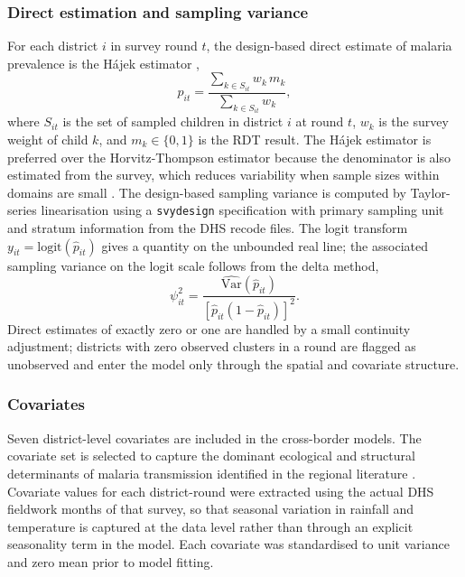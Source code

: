 \documentclass{article}
\begin{document}
\subsubsection{Direct estimation and sampling
variance}\label{direct-estimation-and-sampling-variance}

For each district \(i\) in survey round \(t\), the design-based direct
estimate of malaria prevalence is the Hájek estimator \citep{hajek1971},
\begin{equation}
\hat{p}_{it} = \frac{\sum_{k \in S_{it}} w_k \, m_k}{\sum_{k \in S_{it}} w_k},
\label{eq:hajek}
\end{equation} where \(S_{it}\) is the set of sampled children in
district \(i\) at round \(t\), \(w_k\) is the survey weight of child
\(k\), and \(m_k \in \{0, 1\}\) is the RDT result. The Hájek estimator
is preferred over the Horvitz-Thompson estimator because the denominator
is also estimated from the survey, which reduces variability when sample
sizes within domains are small \citep{cochran1977, lumley2010}. The
design-based sampling variance is computed by Taylor-series
linearisation \citep{binder1983} using a \texttt{svydesign}
specification with primary sampling unit and stratum information from
the DHS recode files. The logit transform
\(y_{it} = \mathrm{logit}(\hat{p}_{it})\) gives a quantity on the
unbounded real line; the associated sampling variance on the logit scale
follows from the delta method, \begin{equation}
\psi_{it}^2 = \frac{\widehat{\mathrm{Var}}(\hat{p}_{it})}{[\hat{p}_{it}(1 - \hat{p}_{it})]^2}.
\label{eq:psi}
\end{equation} Direct estimates of exactly zero or one are handled by a
small continuity adjustment; districts with zero observed clusters in a
round are flagged as unobserved and enter the model only through the
spatial and covariate structure.

\subsubsection{Covariates}\label{covariates}

Seven district-level covariates are included in the cross-border models.
The covariate set is selected to capture the dominant ecological and
structural determinants of malaria transmission identified in the
regional literature \citep{bhatt2015, weiss2020}. Covariate values for
each district-round were extracted using the actual DHS fieldwork months
of that survey, so that seasonal variation in rainfall and temperature
is captured at the data level rather than through an explicit
seasonality term in the model. Each covariate was standardised to unit
variance and zero mean prior to model fitting.
\end{document}
